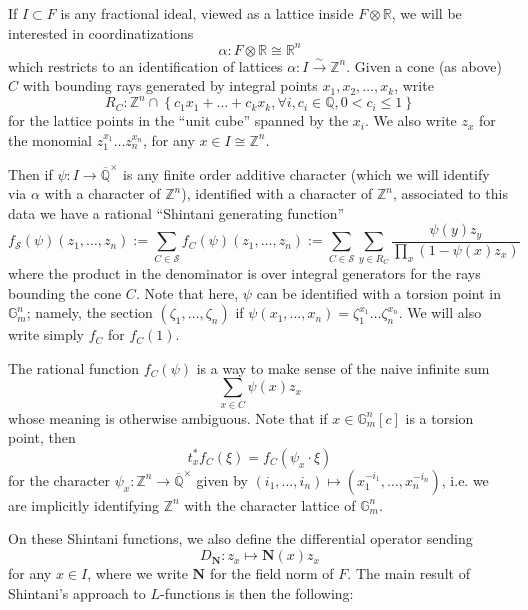 \documentclass[10pt]{amsart}
\theoremstyle{definition}
\newcommand{\Z}{\mathbb{Z}}
\newcommand{\Q}{\mathbb{Q}}
\newcommand{\R}{\mathbb{R}}
\newcommand{\G}{\mathbb{G}}
\numberwithin{equation}{section}
\begin{document}
    If $I\subset F$ is any fractional ideal, viewed as a lattice inside $F\otimes \R$, we will be interested in coordinatizations 
    \[
    \alpha: F\otimes \R \cong \R^n
    \] 
    which restricts to an identification of lattices $\alpha: I\xrightarrow{\sim} \Z^n$.
    Given a cone (as above) $C$ with bounding rays generated by integral points $x_1,x_2,\ldots, x_k$, write
    \[
    R_C: \Z^n \cap \left\{c_1x_1+\ldots + c_kx_k, \forall i, c_i\in \Q, 0<c_i\le 1\right\}
    \]
    for the lattice points in the ``unit cube'' spanned by the $x_i$. We also write $z_{x}$ for the monomial $z_1^{x_1}\ldots z_n^{x_n}$, for any $x\in I\cong \Z^n$.
    
    Then if $\psi:I\to \overline{\Q}^\times$ is any finite order additive character (which we will identify via $\alpha$ with a character of $\Z^n$), identified with a character of $\Z^n$, associated to this data we have a rational ``Shintani generating function''
        \begin{equation} \label{eq:shinfunc}
        f_{\mathscr{S}}(\psi)(z_1,\ldots, z_n):= \sum_{C\in \mathscr{S}} f_C(\psi)(z_1,\ldots, z_n) := \sum_{C\in \mathscr{S}} \sum_{y\in R_C} \frac{\psi(y) z_y}{\prod_{x}  (1-\psi(x)z_x)}
        \end{equation}
    where the product in the denominator is over integral generators for the rays bounding the cone $C$. Note that here, $\psi$ can be identified with a torsion point in $\G_m^n$; namely, the section $(\zeta_1,\ldots, \zeta_n)$ if $\psi(x_1,\ldots, x_n)=\zeta_1^{x_1}\ldots \zeta_n^{x_n}$. We will also write simply $f_C$ for $f_C(1)$.
    
    The rational function $f_C(\psi)$ is a way to make sense of the naive infinite sum
    \begin{equation} \label{eq:naivegen}
        \sum_{x\in C} \psi(x) z_x
    \end{equation}
    whose meaning is otherwise ambiguous. Note that if $x\in \G_m^n[c]$ is a torsion point, then
    \[
    t_x^* f_C(\xi) = f_C(\psi_x\cdot \xi)
    \]
    for the character $\psi_x:\Z^n\to \overline{\Q}^\times$ given by $(i_1,\ldots, i_n)\mapsto (x_1^{-i_1},\ldots, x_n^{-i_n})$,
    i.e. we are implicitly identifying $\Z^n$ with the character lattice of $\G_m^n$.
    
    On these Shintani functions, we also define the differential operator sending
    \[
    D_{\mathbf{N}}: z_x \mapsto \mathbf{N}(x) z_x
    \]
    for any $x\in I$, where we write $\mathbf{N}$ for the field norm of $F$. The main result of Shintani's approach to $L$-functions is then the following:
\end{document}
